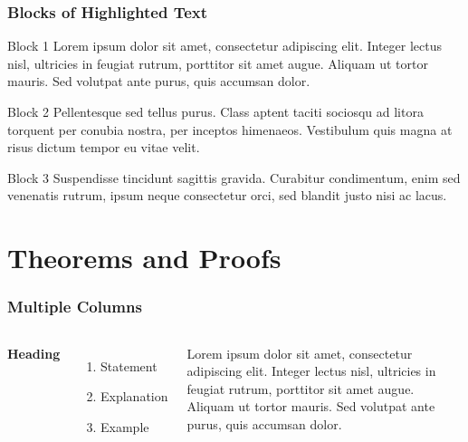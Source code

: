 \documentclass{beamer}
\begin{document}
\begin{frame}
\frametitle{Blocks of Highlighted Text}
\begin{block}{Block 1}
Lorem ipsum dolor sit amet, consectetur adipiscing elit. Integer lectus nisl, ultricies in feugiat rutrum, porttitor sit amet augue. Aliquam ut tortor mauris. Sed volutpat ante purus, quis accumsan dolor.
\end{block}

\begin{block}{Block 2}
Pellentesque sed tellus purus. Class aptent taciti sociosqu ad litora torquent per conubia nostra, per inceptos himenaeos. Vestibulum quis magna at risus dictum tempor eu vitae velit.
\end{block}

\begin{block}{Block 3}
Suspendisse tincidunt sagittis gravida. Curabitur condimentum, enim sed venenatis rutrum, ipsum neque consectetur orci, sed blandit justo nisi ac lacus.
\end{block}
\end{frame}


\section{Theorems and Proofs}

\begin{frame}
\frametitle{Multiple Columns}
\begin{columns}[c] %

\textbf{Heading}
\begin{enumerate}
\item Statement
\item Explanation
\item Example
\end{enumerate}

Lorem ipsum dolor sit amet, consectetur adipiscing elit. Integer lectus nisl, ultricies in feugiat rutrum, porttitor sit amet augue. Aliquam ut tortor mauris. Sed volutpat ante purus, quis accumsan dolor.

\end{columns}
\end{frame}
\end{document}
